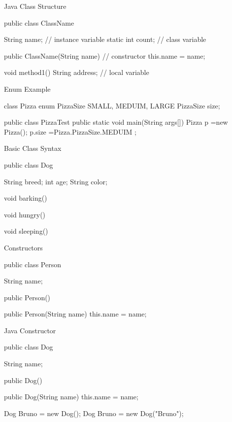 \documentclass[11pt]{beamer}
\begin{document}
\begin{frame}[containsverbatim]{Java Class Structure}
\begin{java}
public class ClassName{
  String name;      // instance variable
  static int count; // class variable

  public ClassName(String name){ // constructor
    this.name = name;  
  }

  void method1(){
    String address; // local variable
  }  
}
\end{java}

\end{frame}


\begin{frame}[containsverbatim]{Enum Example}
\begin{java}
class Pizza{
	enum PizzaSize{ SMALL, MEDUIM, LARGE }
	PizzaSize size;
}

public class PizzaTest{
	public static void main(String args[]){
		Pizza p =new Pizza();
		p.size =Pizza.PizzaSize.MEDUIM ;
	}
}
\end{java}
\end{frame}


\begin{frame}[containsverbatim]{Basic Class Syntax}
\begin{java}
public class Dog{
	String breed;
	int age;
	String color;

	void barking(){
	}

	void hungry(){
	}

	void sleeping(){
	}
}
\end{java}
\end{frame}


\begin{frame}[containsverbatim]{Constructors}
\begin{java}
public class Person{

	String name;
	
	public Person(){
	}
	
	public Person(String name){
		this.name = name;
	}
}
\end{java}
\end{frame}

\begin{frame}[containsverbatim]{Java Constructor}
\begin{java}
public class Dog{
  String name;  
  
  public Dog(){
  }

  public Dog(String name){
  this.name = name;
  }
}
\end{java}


\begin{java}
Dog Bruno = new Dog();
Dog Bruno = new Dog("Bruno");
\end{java}

\end{frame}
\end{document}
